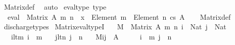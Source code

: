 \begin{isabellebody}
\ Matrix{\isacharunderscore}{\kern0pt}def\ \isamarkupfalse%
\ auto%
\endisatagproof
{\isafoldproof}%
%
\isadelimproof
\isanewline
%
\endisadelimproof
\isanewline
{}\isamarkupfalse%
\ eval{\isacharunderscore}{\kern0pt}type\ {\isacharbrackleft}{\kern0pt}type{\isacharbrackright}{\kern0pt}{\isacharcolon}{\kern0pt}\isanewline
\ \ {\isachardoublequoteopen}eval\ {\isacharcolon}{\kern0pt}\ Matrix\ A\ m\ n\ {\isasymRightarrow}\ {\isacharparenleft}{\kern0pt}x\ {\isacharcolon}{\kern0pt}\ Element\ {\isacharbrackleft}{\kern0pt}{}{\isacharcomma}{\kern0pt}{\isasymdots}{\isacharcomma}{\kern0pt}m{\isacharbrackleft}{\kern0pt}{\isacharparenright}{\kern0pt}\ {\isasymRightarrow}\ Element\ {\isacharbrackleft}{\kern0pt}{}{\isacharcomma}{\kern0pt}{\isasymdots}{\isacharcomma}{\kern0pt}n{\isacharbrackleft}{\kern0pt}\ {\isasymrightarrow}cs\ A{\isachardoublequoteclose}\isanewline
%
\isadelimproof
\ \ %
\endisadelimproof
%
\isatagproof
{}\isamarkupfalse%
\ Matrix{\isacharunderscore}{\kern0pt}def\ \isamarkupfalse%
\ discharge{\isacharunderscore}{\kern0pt}types%
\endisatagproof
{\isafoldproof}%
%
\isadelimproof
\isanewline
%
\endisadelimproof
\isanewline
{}\isamarkupfalse%
\ Matrix{\isacharunderscore}{\kern0pt}eval{\isacharunderscore}{\kern0pt}typeI{\isacharcolon}{\kern0pt}\isanewline
\ \ \ {\isachardoublequoteopen}M\ {\isacharcolon}{\kern0pt}\ Matrix\ A\ m\ n{\isachardoublequoteclose}\ {\isachardoublequoteopen}i\ {\isacharcolon}{\kern0pt}\ Nat{\isachardoublequoteclose}\ {\isachardoublequoteopen}j\ {\isacharcolon}{\kern0pt}\ Nat{\isachardoublequoteclose}\isanewline
\ \ \ i{\isacharunderscore}{\kern0pt}lt{\isacharunderscore}{\kern0pt}m{\isacharcolon}{\kern0pt}\ {\isachardoublequoteopen}i\ {\isacharless}{\kern0pt}\ m{\isachardoublequoteclose}\isanewline
\ \ \ j{\isacharunderscore}{\kern0pt}lt{\isacharunderscore}{\kern0pt}n{\isacharcolon}{\kern0pt}\ {\isachardoublequoteopen}j\ {\isacharless}{\kern0pt}\ n{\isachardoublequoteclose}\isanewline
\ \ \ {\isachardoublequoteopen}M{\isacharbackquote}{\kern0pt}i{\isacharbackquote}{\kern0pt}j\ {\isacharcolon}{\kern0pt}\ A{\isachardoublequoteclose}\isanewline
%
\isadelimproof
%
\endisadelimproof
%
\isatagproof
{}\isamarkupfalse%
\ {\isacharminus}{\kern0pt}\isanewline
\ \ \isamarkupfalse%
\ {\isachardoublequoteopen}i\ {\isasymin}\ {\isacharbrackleft}{\kern0pt}{}{\isacharcomma}{\kern0pt}{\isasymdots}{\isacharcomma}{\kern0pt}m{\isacharbrackleft}{\kern0pt}{\isachardoublequoteclose}\ {\isachardoublequoteopen}j\ {\isasymin}\ {\isacharbrackleft}{\kern0pt}{}{\isacharcomma}{\kern0pt}{\isasymdots}{\isacharcomma}{\kern0pt}n{\isacharbrackleft}{\kern0pt}{\isachardoublequoteclose}\ \isamarkupfalse%

\end{isabellebody}
